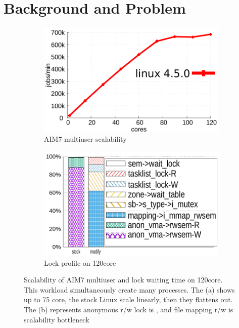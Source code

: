 \section{Background and Problem}


\begin{figure}
  \begin{subfigure}[b]{0.23\textwidth}
    \includegraphics[width=\textwidth]{graph/aim7_default}
    \caption{AIM7-multiuser scalability}
  \end{subfigure}%
  \begin{subfigure}[b]{0.25\textwidth}
    \includegraphics[width=\textwidth]{graph/lockstat}
    \caption{Lock profile on 120core}
  \end{subfigure}
  \centering
  \footnotesize {
  \caption{Scalability of AIM7 multiuser and lock waiting time on 120core.
  This workload simultaneously create many processes. The (a) shows up to 75
  core, the stock Linux scale linearly, then they flattens out. The (b)
  represents anonymous r/w lock is , and file mapping r/w is scalability
  bottleneck}
  \label{fig:aim7_default} }
\end{figure}

